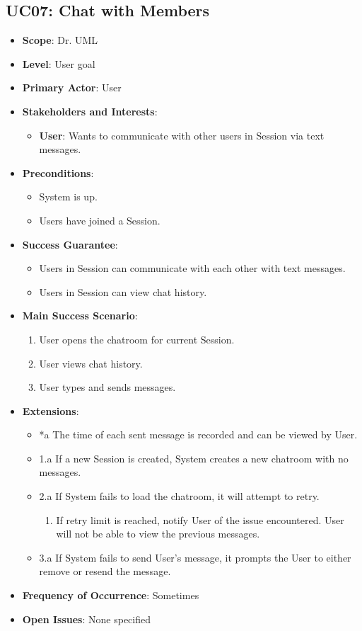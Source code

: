 \documentclass[12pt]{article}
\begin{document}
\subsection{UC07: Chat with Members}
\begin{itemize}
    \item \textbf{Scope}: Dr. UML
    \item \textbf{Level}: User goal
    \item \textbf{Primary Actor}: User
    \item \textbf{Stakeholders and Interests}:
    \begin{itemize}
        \item \textbf{User}: Wants to communicate with other users in Session via text messages.
    \end{itemize}
    \item \textbf{Preconditions}:
    \begin{itemize}
        \item System is up.
        \item Users have joined a Session.
    \end{itemize}
    \item \textbf{Success Guarantee}:
    \begin{itemize}
        \item Users in Session can communicate with each other with text messages.
        \item Users in Session can view chat history.
    \end{itemize}
    \item \textbf{Main Success Scenario}:
    \begin{enumerate}
        \item User opens the chatroom for current Session.
        \item User views chat history.
        \item User types and sends messages.
    \end{enumerate}
    \item \textbf{Extensions}:
    \begin{itemize}
        \item *a The time of each sent message is recorded and can be viewed by User.
        \item 1.a If a new Session is created, System creates a new chatroom with no messages.
        \item 2.a If System fails to load the chatroom, it will attempt to retry.
        \begin{enumerate}
            \item If retry limit is reached, notify User of the issue encountered. User will not be able to view the previous messages.
        \end{enumerate}
        \item 3.a If System fails to send User's message, it prompts the User to either remove or resend the message.
    \end{itemize}
    \item \textbf{Frequency of Occurrence}: Sometimes
    \item \textbf{Open Issues}: None specified
\end{itemize}
\end{document}
